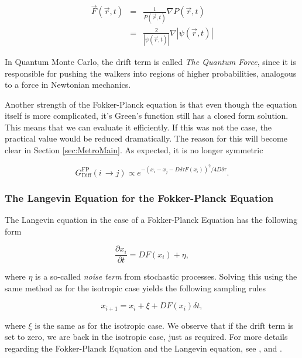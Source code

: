 \begin{eqnarray}
 \vec F(\vec r, t) &=& \frac{1}{P(\vec r, t)}\nabla P(\vec r, t) \nonumber \\
                   &=& \frac{2}{|\psi(\vec r, t)|}\nabla |\psi(\vec r, t)|
\end{eqnarray}

In Quantum Monte Carlo, the drift term is called \textit{The Quantum Force}, since it is responsible for pushing the walkers into regions of higher probabilities, analogous to a force in Newtonian mechanics.

Another strength of the Fokker-Planck equation is that even though the equation itself is more complicated, it's Green's function still has a closed form solution. This means that we can evaluate it efficiently. If this was not the case, the practical value would be reduced dramatically. The reason for this will become clear in Section \ref{sec:MetroMain}. As expected, it is no longer symmetric 

\begin{equation}
\label{eq:GF_FP}
 G_\mathrm{Diff}^\mathrm{FP}(i\,\rightarrow j) \propto e^{-(x_i-x_j - D\delta\tau F(x_i))^2/4D\delta\tau}.
\end{equation}


\subsubsection{The Langevin Equation for the Fokker-Planck Equation}

The Langevin equation in the case of a Fokker-Planck Equation has the following form

\begin{equation}
 \frac{\partial x_i}{\partial t} = D F(x_i) + \eta,
\end{equation}

where $\eta$ is a so-called \textit{noise term} from stochastic processes. Solving this using the same method as for the isotropic case yields the following sampling rules

\begin{equation}
 \label{eq:langevinSolFP}
 x_{i+1} = x_i + \xi + DF(x_i)\delta t,
\end{equation}

where $\xi$ is the same as for the isotropic case. We observe that if the drift term is set to zero, we are back in the isotropic case, just as required. For more details regarding the Fokker-Planck Equation and the Langevin equation, see \cite{Gardiner:2004bk}, \cite{risken1989fpe} and \cite{langevin}.


